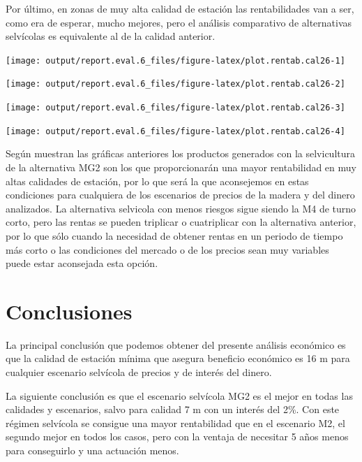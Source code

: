 \documentclass[]{article}
\begin{document}
Por último, en zonas de muy alta calidad de estación las rentabilidades
van a ser, como era de esperar, mucho mejores, pero el análisis
comparativo de alternativas selvícolas es equivalente al de la calidad
anterior.

\begin{center}\texttt{[image: output/report.eval.6\_files/figure-latex/plot.rentab.cal26-1]} \end{center}

\begin{center}\texttt{[image: output/report.eval.6\_files/figure-latex/plot.rentab.cal26-2]} \end{center}

\begin{center}\texttt{[image: output/report.eval.6\_files/figure-latex/plot.rentab.cal26-3]} \end{center}

\begin{center}\texttt{[image: output/report.eval.6\_files/figure-latex/plot.rentab.cal26-4]} \end{center}

Según muestran las gráficas anteriores los productos generados con la
selvicultura de la alternativa MG2 son los que proporcionarán una mayor
rentabilidad en muy altas calidades de estación, por lo que será la que
aconsejemos en estas condiciones para cualquiera de los escenarios de
precios de la madera y del dinero analizados. La alternativa selvicola
con menos riesgos sigue siendo la M4 de turno corto, pero las rentas se
pueden triplicar o cuatriplicar con la alternativa anterior, por lo que
sólo cuando la necesidad de obtener rentas en un periodo de tiempo más
corto o las condiciones del mercado o de los precios sean muy variables
puede estar aconsejada esta opción.

\section{Conclusiones}\label{conclusiones}

La principal conclusión que podemos obtener del presente análisis
económico es que la calidad de estación mínima que asegura beneficio
económico es 16 m para cualquier escenario selvícola de precios y de
interés del dinero.

La siguiente conclusión es que el escenario selvícola MG2 es el mejor en
todas las calidades y escenarios, salvo para calidad 7 m con un interés
del 2\%. Con este régimen selvícola se consigue una mayor rentabilidad
que en el escenario M2, el segundo mejor en todos los casos, pero con la
ventaja de necesitar 5 años menos para conseguirlo y una actuación
menos.
\end{document}
